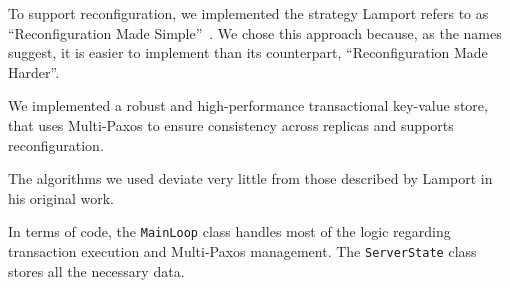 \documentclass[times, 10pt,twocolumn]{article}
\begin{document}
    To support reconfiguration, we implemented the strategy Lamport refers to as
    ``Reconfiguration Made Simple''~\cite{lamportReconfiguringStateMachine2010}.
    We chose this approach because, as the names suggest, it is easier to
    implement than its counterpart, ``Reconfiguration Made Harder''.

    We implemented a robust and high-performance transactional key-value store,
    that uses Multi-Paxos to ensure consistency across replicas and supports
    reconfiguration.

    The algorithms we used deviate very little from those described by Lamport
    in his original work.

    In terms of code, the \verb|MainLoop| class handles most of the logic
    regarding transaction execution and Multi-Paxos management. The
    \verb|ServerState| class stores all the necessary data.



\end{document}
